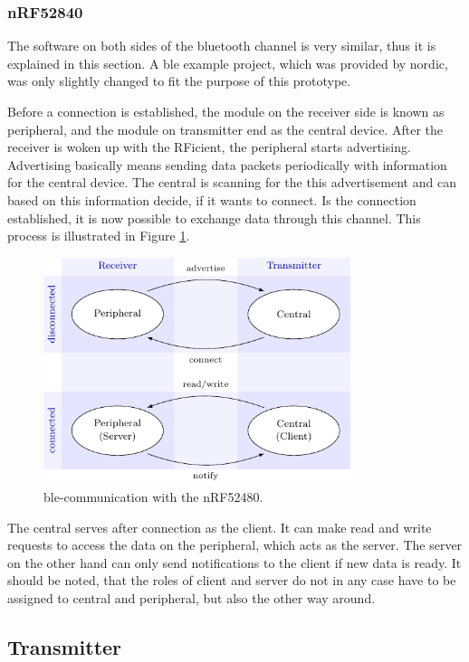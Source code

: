 \subsubsection{nRF52840}
The software on both sides of the bluetooth channel is very similar, thus it is explained in this section.
A \acs{ble} example project, which was provided by nordic, was only slightly changed to fit the purpose of this prototype.

Before a connection is established, the module on the receiver side is known as peripheral, and the module on transmitter end as the central device.
After the receiver is woken up with the RFicient, the peripheral starts advertising.
Advertising basically means sending data packets periodically with information for the central device.
The central is scanning for the this advertisement and can based on this information decide, if it wants to connect.
Is the connection established, it is now possible to exchange data through this channel.
This process is illustrated in Figure \ref{software:ble}.
\begin{figure}[ht]
	\centering
	\includegraphics[width=0.8\textwidth]{4-development/software/graphics/ble.pdf}
	\caption{\acs{ble}-communication with the nRF52480.\label{software:ble}}
\end{figure}

The central serves after connection as the client.
It can make read and write requests to access the data on the peripheral, which acts as the server.
The server on the other hand can only send notifications to the client if new data is ready.
It should be noted, that the roles of client and server do not in any case have to be assigned to central and peripheral, but also the other way around. 

\subsection{Transmitter}

